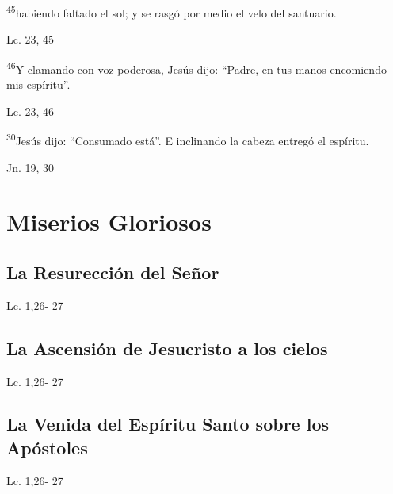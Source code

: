 \documentclass[a4paper,11pt]{article}
\begin{document}
      \textsuperscript{45}habiendo faltado el sol; y se rasgó por medio el velo del santuario.
      \begin{center}
        Lc. 23, 45
      \end{center}

      \textsuperscript{46}Y clamando con voz poderosa, Jesús dijo: ``Padre, en tus manos encomiendo mis espíritu''.
      \begin{center}
        Lc. 23, 46 
      \end{center}

      \textsuperscript{30}Jesús dijo: ``Consumado está''. E inclinando la cabeza entregó el espíritu.
      \begin{center}
        Jn. 19, 30
      \end{center}
 
    \newpage
         
  \section*{\hfil Miserios Gloriosos \hfil}
    \subsection*{\hfil La Resurección del Señor \hfil}
      \begin{multicols}{2}

      \columnbreak
                           
      \end{multicols}
      \begin{center}
        Lc. 1,26- 27           
      \end{center}
    \subsection*{\hfil La Ascensión de Jesucristo a los cielos \hfil}
      \begin{multicols}{2}

      \columnbreak
                           
      \end{multicols}         
      \begin{center}
        Lc. 1,26- 27           
      \end{center}
    \subsection*{\hfil La Venida del Espíritu Santo sobre los Apóstoles \hfil}
      \begin{multicols}{2}

      \columnbreak
                           
      \end{multicols}         
      \begin{center}
        Lc. 1,26- 27           
      \end{center}
\end{document}
